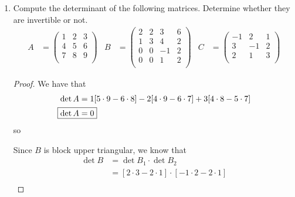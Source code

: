 \documentclass[../psets.tex]{subfiles}
\begin{document}
\begin{enumerate}
\begin{proof}
\begin{align*}
\begin{pmatrix}
                0 & 1\\
            \end{pmatrix}&
                &=
                \begin{pmatrix}
                    1 & 0\\
                    0 & 1\\
                \end{pmatrix}
        \end{align*}
        as expected.
    \end{proof}
    \item Compute the determinant of the following matrices. Determine whether they are invertible or not.
    \begin{align*}
        A &=
        \begin{pmatrix}
            1 & 2 & 3\\
            4 & 5 & 6\\
            7 & 8 & 9\\
        \end{pmatrix}&
        B &=
        \begin{pmatrix}
            2 & 2 & 3 & 6\\
            1 & 3 & 4 & 2\\
            0 & 0 & -1 & 2\\
            0 & 0 & 1 & 2\\
        \end{pmatrix}&
        C &=
        \begin{pmatrix}
            -1 & 2 & 1\\
            3 & -1 & 2\\
            2 & 1 & 3\\
        \end{pmatrix}
    \end{align*}
    \begin{proof}
        We have that
        \begin{align*}
            \det A &= 1[5\cdot 9-6\cdot 8]-2[4\cdot 9-6\cdot 7]+3[4\cdot 8-5\cdot 7]\\
            \Aboxed{\det A &= 0}
        \end{align*}
        so \par
        Since $B$ is block upper triangular, we know that
        \begin{align*}
            \det B &= \det B_1\cdot\det B_2\\
            &= [2\cdot 3-2\cdot 1]\cdot[-1\cdot 2-2\cdot 1]\\

\end{align*}
\end{proof}
\end{enumerate}
\end{document}
